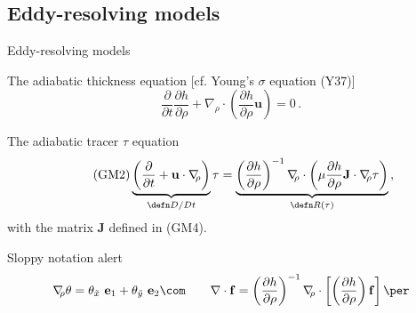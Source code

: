\documentclass{beamer}
\begin{document}
\subsection{Eddy-resolving models}

\begin{frame}{Eddy-resolving models}
\vspace{-.2cm}
\begin{exampleblock}{The adiabatic thickness equation [cf. Young's $\sigma$ equation (Y37)]}
\begin{equation}\tag{GM1}
  \frac{\partial}{\partial t} \frac{\partial h}{\partial \rho} + \nabla_{\!\!\rho} \cdot
  \left(\frac{\partial h}{\partial \rho} \mathbf{u} \right) = 0\,.
\end{equation}
\end{exampleblock}

\begin{exampleblock}{The adiabatic tracer $\tau$ equation}
\begin{equation}\tag{GM2}
\underbrace{\left(\frac{\partial }{\partial t} + \mathbf{u}\cdot\nabla_{\!\!\rho}\right)}_{\defn D/D t}\tau
 = \underbrace{\left( \frac{\partial h}{\partial \rho}\right)^{-1}\nabla_{\!\!\rho} \cdot
 \left(\mu \frac{\partial h}{\partial \rho} \mathbf{J}
 \cdot \nabla_{\!\!\rho} \tau \right)}_{\defn R(\tau)} \,,
\end{equation}
with the matrix $\mathbf{J}$ defined in (GM4).

\end{exampleblock}


\begin{block}{Sloppy notation {\sc alert}}
\vspace{-.35cm}
\begin{equation}
  \nabla_{\!\!\rho} \theta = \theta_{\tilde x}~ \mathbf{e}_1 + \theta_{\tilde y}~ \mathbf{e}_2\com
  \qquad \nabla \cdot \mathbf{f} =  \left( \frac{\partial h}{\partial \rho}\right)^{-1}   \nabla_{\!\!\rho} \cdot
\left[ \left(\frac{\partial h}{\partial \rho}\right)\mathbf{f}\right]\per \nonumber
\end{equation}
\end{block}

\end{frame}
\end{document}
